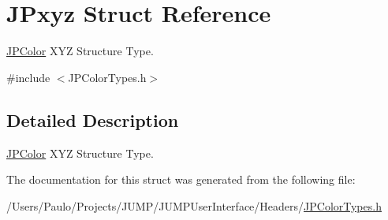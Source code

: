 \hypertarget{struct_j_pxyz}{
\section{JPxyz Struct Reference}
\label{struct_j_pxyz}
}


\hyperlink{interface_j_p_color}{JPColor} XYZ Structure Type.  




{\ttfamily \#include $<$JPColorTypes.h$>$}



\subsection{Detailed Description}
\hyperlink{interface_j_p_color}{JPColor} XYZ Structure Type. 

The documentation for this struct was generated from the following file:\begin{DoxyCompactItemize}
\item 
/Users/Paulo/Projects/JUMP/JUMPUserInterface/Headers/\hyperlink{_j_p_color_types_8h}{JPColorTypes.h}\end{DoxyCompactItemize}
